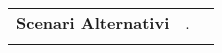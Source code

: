 \begin{table}[h]
\begin{tabular}{ l c r}
    				\\ 
    				
    			\multirow{1}{*}{\textbf{Scenari Alternativi}} & . \\ \\
    			
  
  			\end{tabular}
			\end{table}  			